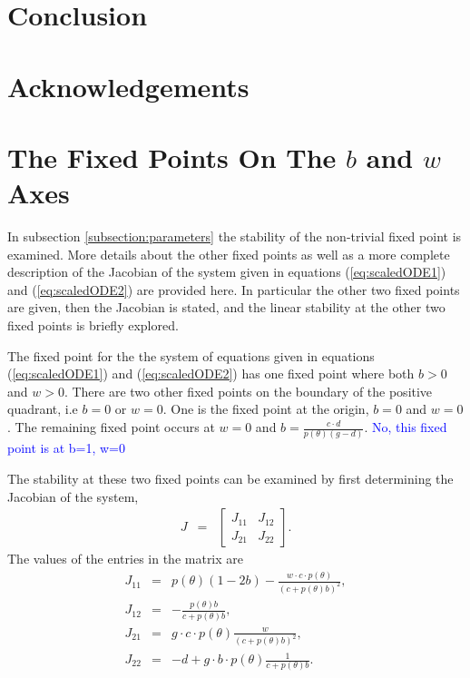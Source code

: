 \documentclass[review]{elsarticle}
\begin{document}
\section{Conclusion}

\section{Acknowledgements}

\clearpage

\appendix

\section{The Fixed Points On The $b$ and $w$ Axes}
\label{appendix:otherFixedPoints}

In subsection \ref{subsection:parameters} the stability of the
non-trivial fixed point is examined. More details about the other
fixed points as well as a more complete description of the Jacobian of
the system given in equations (\ref{eq:scaledODE1}) and
(\ref{eq:scaledODE2}) are provided here. In particular the other two
fixed points are given, then the Jacobian is stated, and the linear
stability at the other two fixed points is briefly explored.

The fixed point for the the system of equations given in equations
(\ref{eq:scaledODE1}) and (\ref{eq:scaledODE2}) has one fixed point
where both $b>0$ and $w>0$. There are two other fixed points on the boundary of the positive quadrant, i.e $b=0$ or $w=0$.  One is the fixed point at the origin, $b=0$ and $w=0$.
The remaining fixed point occurs at $w=0$ and $b=\frac{c\cdot
  d}{p(\theta)\left(g - d\right)}$. \textcolor{blue} {No, this fixed point is at b=1, w=0}
  

The stability at these two fixed points can be examined by first
determining the Jacobian of the system,
\begin{eqnarray*}
  J & = & \left[
          \begin{array}{rr}
            J_{11} & J_{12} \\
            J_{21} & J_{22}
          \end{array}
          \right].
\end{eqnarray*}
The values of the entries in the matrix are
\begin{eqnarray*}
  J_{11} & = & p(\theta)\left(1-2b\right) -
               \frac{w\cdot c \cdot p(\theta)}{\left( c + p(\theta)b \right)^2}, \\
  J_{12} & = & -\frac{p(\theta)b}{c+p(\theta)b}, \\
  J_{21} & = & g\cdot c \cdot  p(\theta) \frac{w}{\left(c+p(\theta)b\right)^2}, \\
  J_{22} & = & -d + g\cdot b \cdot  p(\theta) \frac{1}{c+p(\theta)b}.
\end{eqnarray*}
\end{document}
